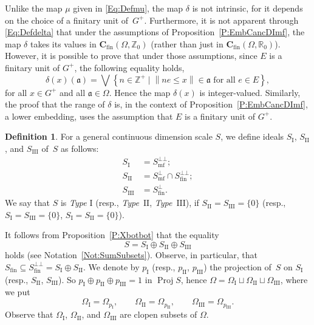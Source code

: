 \documentclass[psamsfonts,reqno]{memo-l}
\theoremstyle{plain}
\theoremstyle{definition}
\newtheorem{definition}[lemma]{Definition}
\theoremstyle{remark}
\numberwithin{equation}{section}
\newcommand{\CC}{\mathbf{C}}
\newcommand{\fa}{\mathfrak{a}}
\newcommand{\fin}{\mathrm{fin}}
\newcommand{\mf}{\mathrm{mf}}
\newcommand{\bv}[1]{\left\|#1\right\|}
\newcommand{\I}{\mathrm{I}}
\newcommand{\II}{\mathrm{II}}
\newcommand{\III}{\mathrm{III}}
\newcommand{\ZZ}{\mathbb{Z}}
\newcommand{\RR}{\mathbb{R}}
\DeclareMathOperator{\BB}{Proj}
\newcommand{\set}[1]{\{#1\}}
\newcommand{\Set}[1]{\left\{#1\right\}}
\newcommand{\Setm}[2]{\Set{#1\mid#2}}
\begin{document}
Unlike the map $\mu$ given in \eqref{Eq:Defmu}, the map $\delta$ is
not intrinsic, for it depends on the choice of a finitary unit of~$G^+$.
Furthermore, it is not apparent through \eqref{Eq:Defdelta} that under the
assumptions of Proposition~\ref{P:EmbCancDImf}, the map $\delta$ takes its
values in $\CC_{\fin}(\Omega,\ZZ_0)$ (rather than just in
$\CC_{\fin}(\Omega,\RR_0)$). However, it is possible to prove that under
those assumptions, since $E$ is a finitary unit of $G^+$, the following
equality holds,
   \begin{equation}\label{Eq:Defdelta2}
   \delta(x)(\fa)=\bigvee\Setm{n\in\ZZ^+}
   {\bv{ne\leq x}\in\fa\text{ for all }e\in E},
   \end{equation}
for all $x\in G^+$ and all $\fa\in\Omega$. Hence the map $\delta(x)$ is
integer-valued. Similarly, the proof that the range of $\delta$ is, in the
context of Proposition~\ref{P:EmbCancDImf}, a lower embedding, uses the assumption that $E$ is a finitary unit of $G^+$.

\begin{definition}\label{D:SI,II,III}
For a general continuous dimension scale $S$, we define
ideals $S_{\I}$,
$S_{\II}$, and $S_{\III}$ of~$S$ as follows:
   \begin{align*}
   S_{\I}&=S_{\mf}^{\bot\bot};\\
   S_{\II}&=S_{\mf}^\bot\cap S_{\fin}^{\bot\bot};\\
   S_{\III}&=S_{\fin}^{\bot}.
   \end{align*}
We say that $S$ is \emph{Type $\I$} (resp., \emph{Type~$\II$},
\emph{Type~$\III$}),
 if
$S_{\II}=S_{\III}=\set{0}$ (resp., $S_{\I}=S_{\III}=\set{0}$,
$S_{\I}=S_{\II}=\set{0}$).
\end{definition}

It follows from Proposition~\ref{P:Xbotbot} that the equality
   \[
   S=S_{\I}\oplus S_{\II}\oplus S_{\III}
   \]
holds (see Notation~\ref{Not:SumSubsets}). Observe, in particular, that
$S_\fin\subseteq S_{\fin}^{\bot\bot}=S_{\I}\oplus S_{\II}$.
We denote by $p_{\I}$ (resp., $p_{\II}$, $p_{\III}$) the projection
of~$S$ on $S_{\I}$ (resp., $S_{\II}$, $S_{\III}$).
So $p_{\I}\oplus p_{\II}\oplus p_{\III}=1$ in
\index{pzzroj@$\BB{S}$} $\BB{S}$, hence
$\Omega=\Omega_{\I}\sqcup\Omega_{\II}\sqcup\Omega_{\III}$,
where we put
   \[
   \Omega_{\I}=\Omega_{p_{\I}},\qquad\Omega_{\II}=\Omega_{p_{\II}},\qquad
   \Omega_{\III}=\Omega_{p_{\III}}.
   \]
Observe that $\Omega_{\I}$, $\Omega_{\II}$, and $\Omega_{\III}$ are clopen
subsets of $\Omega$.
\end{document}

